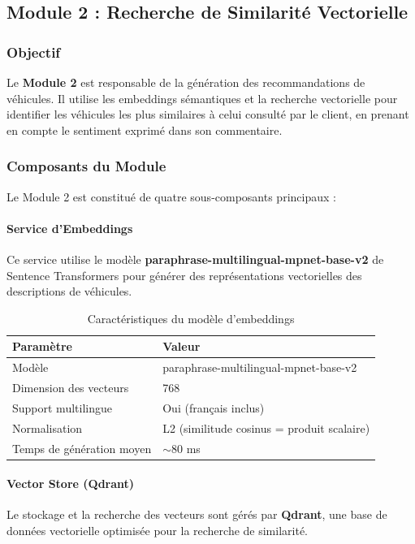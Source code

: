 \documentclass[11pt,a4paper]{report}
\begin{document}
\subsection{Module 2 : Recherche de Similarité Vectorielle}
\label{subsec:module2_similarity}

\subsubsection{Objectif}
Le \textbf{Module 2} est responsable de la génération des recommandations de véhicules. Il utilise les embeddings sémantiques et la recherche vectorielle pour identifier les véhicules les plus similaires à celui consulté par le client, en prenant en compte le sentiment exprimé dans son commentaire.

\subsubsection{Composants du Module}

Le Module 2 est constitué de quatre sous-composants principaux :

\paragraph{Service d'Embeddings}
Ce service utilise le modèle \textbf{paraphrase-multilingual-mpnet-base-v2} de Sentence Transformers pour générer des représentations vectorielles des descriptions de véhicules.

\begin{table}[H]
    \centering
    \caption{Caractéristiques du modèle d'embeddings}
    \label{tab:modele_embeddings}
    \begin{tabular}{|l|l|}
        \hline
        \textbf{Paramètre} & \textbf{Valeur} \\
        \hline
        Modèle & paraphrase-multilingual-mpnet-base-v2 \\
        Dimension des vecteurs & 768 \\
        Support multilingue & Oui (français inclus) \\
        Normalisation & L2 (similitude cosinus = produit scalaire) \\
        Temps de génération moyen & $\sim$80 ms \\
        \hline
    \end{tabular}
\end{table}

\paragraph{Vector Store (Qdrant)}
Le stockage et la recherche des vecteurs sont gérés par \textbf{Qdrant}, une base de données vectorielle optimisée pour la recherche de similarité.
\end{document}
